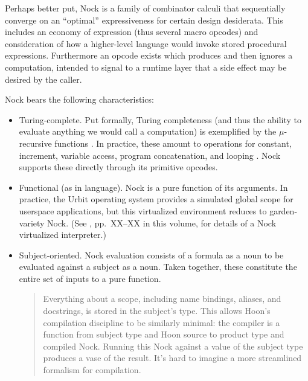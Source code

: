 \documentclass[twoside]{article}
\begin{document}
Perhaps better put, Nock is a family of combinator calculi that sequentially converge on an ``optimal'' expressiveness for certain design desiderata.  This includes an economy of expression (thus several macro opcodes) and consideration of how a higher-level language would invoke stored procedural expressions.  Furthermore an opcode exists which produces and then ignores a computation, intended to signal to a runtime layer that a side effect may be desired by the caller.

Nock bears the following characteristics:

\begin{itemize}
  \item  Turing-complete.  Put formally, Turing completeness (and thus the ability to evaluate anything we would call a computation) is exemplified by the $μ$-recursive functions \citep{WikipediaMuRecursive}.  In practice, these amount to operations for constant, increment, variable access, program concatenation, and looping \citep{Raphael2012}.  Nock supports these directly through its primitive opcodes.

  \item  Functional (as in language).  Nock is a pure function of its arguments.  In practice, the Urbit operating system provides a simulated global scope for userspace applications, but this virtualized environment reduces to garden-variety Nock.  (See \citet{Davis2025b}, pp.~XX–XX in this volume, for details of a Nock virtualized interpreter.)
  \item  Subject-oriented.  Nock evaluation consists of a formula as a noun to be evaluated against a subject as a noun.  Taken together, these constitute the entire set of inputs to a pure function.

    \begin{quote}
    Everything about a scope, including name bindings, aliases, and docstrings, is stored in the subject's type. This allows Hoon's compilation discipline to be similarly minimal: the compiler is a function from subject type and Hoon source to product type and compiled Nock. Running this Nock against a value of the subject type produces a vase of the result. It's hard to imagine a more streamlined formalism for compilation.  \citep{Blackman2020}
    \end{quote}


\end{itemize}
\end{document}
